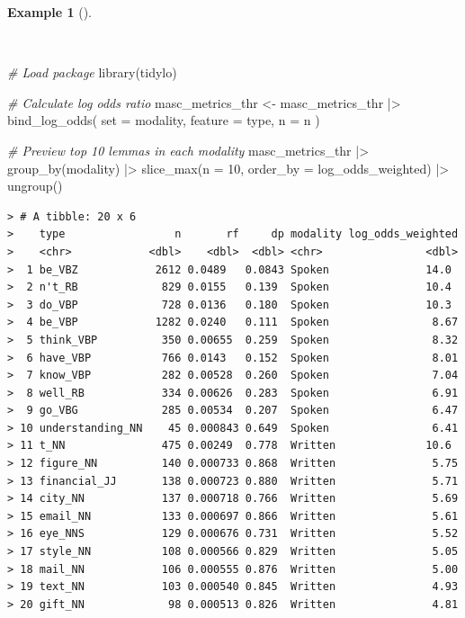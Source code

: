 \documentclass[
  letterpaper,
]{latex/krantz}
\newenvironment{Shaded}{\begin{snugshade}}{\end{snugshade}}
\newcommand{\AttributeTok}[1]{\textcolor[rgb]{0.00,0.00,0.00}{#1}}
\newcommand{\CommentTok}[1]{\textcolor[rgb]{0.00,0.00,0.00}{\textit{#1}}}
\newcommand{\DecValTok}[1]{\textcolor[rgb]{0.00,0.00,0.00}{#1}}
\newcommand{\FunctionTok}[1]{\textcolor[rgb]{0.00,0.00,0.00}{#1}}
\newcommand{\NormalTok}[1]{\textcolor[rgb]{0.00,0.00,0.00}{#1}}
\newcommand{\OtherTok}[1]{\textcolor[rgb]{0.00,0.00,0.00}{#1}}
\newcommand{\SpecialCharTok}[1]{\textcolor[rgb]{0.00,0.00,0.00}{#1}}
\theoremstyle{definition}
\newtheorem{example}{Example}[chapter]
\theoremstyle{remark}
\begin{document}
\begin{example}[]\protect\hypertarget{exm-eda-masc-log-odds-weighted}{}\label{exm-eda-masc-log-odds-weighted}

~

\begin{Shaded}
\begin{Highlighting}[]
\CommentTok{\# Load package}
\FunctionTok{library}\NormalTok{(tidylo)}

\CommentTok{\# Calculate log odds ratio}
\NormalTok{masc\_metrics\_thr }\OtherTok{\textless{}{-}}
\NormalTok{  masc\_metrics\_thr }\SpecialCharTok{|\textgreater{}}
  \FunctionTok{bind\_log\_odds}\NormalTok{(}
    \AttributeTok{set =}\NormalTok{ modality,}
    \AttributeTok{feature =}\NormalTok{ type,}
    \AttributeTok{n =}\NormalTok{ n}
\NormalTok{  )}

\CommentTok{\# Preview top 10 lemmas in each modality}
\NormalTok{masc\_metrics\_thr }\SpecialCharTok{|\textgreater{}}
  \FunctionTok{group\_by}\NormalTok{(modality) }\SpecialCharTok{|\textgreater{}}
  \FunctionTok{slice\_max}\NormalTok{(}\AttributeTok{n =} \DecValTok{10}\NormalTok{, }\AttributeTok{order\_by =}\NormalTok{ log\_odds\_weighted) }\SpecialCharTok{|\textgreater{}}
  \FunctionTok{ungroup}\NormalTok{()}
\end{Highlighting}
\end{Shaded}

\begin{verbatim}
> # A tibble: 20 x 6
>    type                 n       rf     dp modality log_odds_weighted
>    <chr>            <dbl>    <dbl>  <dbl> <chr>                <dbl>
>  1 be_VBZ            2612 0.0489   0.0843 Spoken               14.0 
>  2 n't_RB             829 0.0155   0.139  Spoken               10.4 
>  3 do_VBP             728 0.0136   0.180  Spoken               10.3 
>  4 be_VBP            1282 0.0240   0.111  Spoken                8.67
>  5 think_VBP          350 0.00655  0.259  Spoken                8.32
>  6 have_VBP           766 0.0143   0.152  Spoken                8.01
>  7 know_VBP           282 0.00528  0.260  Spoken                7.04
>  8 well_RB            334 0.00626  0.283  Spoken                6.91
>  9 go_VBG             285 0.00534  0.207  Spoken                6.47
> 10 understanding_NN    45 0.000843 0.649  Spoken                6.41
> 11 t_NN               475 0.00249  0.778  Written              10.6 
> 12 figure_NN          140 0.000733 0.868  Written               5.75
> 13 financial_JJ       138 0.000723 0.880  Written               5.71
> 14 city_NN            137 0.000718 0.766  Written               5.69
> 15 email_NN           133 0.000697 0.866  Written               5.61
> 16 eye_NNS            129 0.000676 0.731  Written               5.52
> 17 style_NN           108 0.000566 0.829  Written               5.05
> 18 mail_NN            106 0.000555 0.876  Written               5.00
> 19 text_NN            103 0.000540 0.845  Written               4.93
> 20 gift_NN             98 0.000513 0.826  Written               4.81
\end{verbatim}

\end{example}
\end{document}
